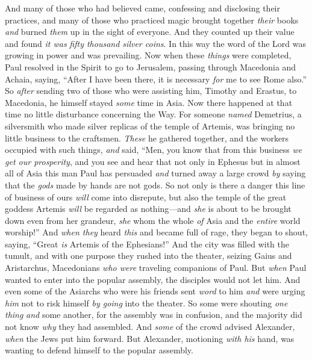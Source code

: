 \begin{biblechapter}
\verse And many of those who had believed came, confessing and disclosing their practices,
\verse and many of those who practiced magic brought together \textit{their} books \textit{and} burned \textit{them} up in the sight of everyone. And they counted up their value and found \textit{it was} \textit{fifty thousand silver coins}.
\verse In this way the word of the Lord was growing in power and was prevailing.
 Now when these \textit{things} were completed, Paul resolved in the Spirit to go to Jerusalem, passing through Macedonia and Achaia, saying, “After I have been there, it is necessary \textit{for} me to see Rome also.”
\verse So \textit{after} sending two of those who were assisting him, Timothy and Erastus, to Macedonia, he himself stayed \textit{some} time in Asia.
\verse Now there happened at that time no little disturbance concerning the Way.
\verse For someone \textit{named} Demetrius, a silversmith who made silver replicas of the temple of Artemis, was bringing no little business to the craftsmen.
\verse \textit{These} he gathered together, and the workers occupied with such things, \textit{and} said, “Men, you know that from this business \textit{we get our prosperity},
\verse and you see and hear that not only in Ephesus but in almost all of Asia this man Paul has persuaded \textit{and} turned away a large crowd \textit{by} saying that the \textit{gods} made by hands are not gods.
\verse So not only is there a danger this line of business of ours \textit{will} come into disrepute, but also the temple of the great goddess Artemis \textit{will} be regarded as nothing—and \textit{she} is about to be brought down even from her grandeur, \textit{she} whom the whole \textit{of} Asia and the \textit{entire} world worship!”
\verse And \textit{when they} heard \textit{this} and became full of rage, they began to shout, saying, “Great \textit{is} Artemis of the Ephesians!”
\verse And the city was filled with the tumult, and with one purpose they rushed into the theater, seizing Gaius and Aristarchus, Macedonians \textit{who were} traveling companions of Paul.
\verse But \textit{when} Paul wanted to enter into the popular assembly, the disciples would not let him.
\verse And even some of the Asiarchs who were his friends sent \textit{word} to him \textit{and} were urging \textit{him} not to risk himself \textit{by going} into the theater.
\verse So some were shouting \textit{one thing} \textit{and} some another, for the assembly was in confusion, and the majority did not know \textit{why} they had assembled.
\verse And \textit{some} of the crowd advised Alexander, \textit{when} the Jews put him forward. But Alexander, motioning \textit{with his} hand, was wanting to defend himself to the popular assembly.

\end{biblechapter}
